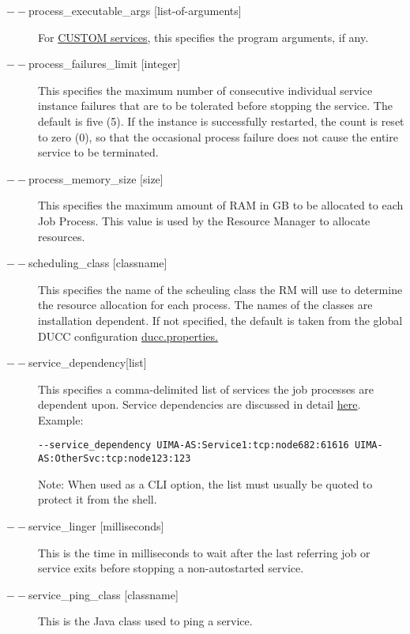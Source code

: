 \begin{description}
      \item[$--$process\_executable\_args {[list-of-arguments]}] For \hyperref[sec:services.types]{CUSTOM
          services}, this specifies the program arguments, if any.

      \item[$--$process\_failures\_limit {[integer]}] 
        This specifies the maximum number of consecutive individual service instance failures that are to be 
        tolerated before stopping the service. The default is five (5). If the instance is successfully
        restarted, the count is reset to zero (0), so that the occasional process failure does not cause
        the entire service to be terminated.
        
      \item[$--$process\_memory\_size {[size]}] This specifies the maximum amount of RAM in GB to be
        allocated to each Job Process.  This value is used by the Resource Manager to allocate
        resources. 

      \item[$--$scheduling\_class {[classname]}] This specifies the name of the scheuling class the RM
        will use to determine the resource allocation for each process. The names of the classes are
        installation dependent. If not specified, the default is taken from the global DUCC
        configuration \hyperref[sec:ducc.properties]{ducc.properties.}

      \item[$--$service\_dependency{[list]}] This specifies a comma-delimited list of services the job
        processes are dependent upon. Service dependencies are discussed in detail
        \hyperref[sec:service.endpoints]{here}. Example:
\begin{verbatim}
--service_dependency UIMA-AS:Service1:tcp:node682:61616 UIMA-AS:OtherSvc:tcp:node123:123 
\end{verbatim}

        Note: When used as a CLI option, the list must usually be
        quoted to protect it from the shell.
          

      \item[$--$service\_linger {[milliseconds]}] This is the time in milliseconds to wait after the last
        referring job or service exits before stopping a non-autostarted service.

      \item[$--$service\_ping\_class {[classname]}] This is the Java class used to ping a service. 


\end{description}
